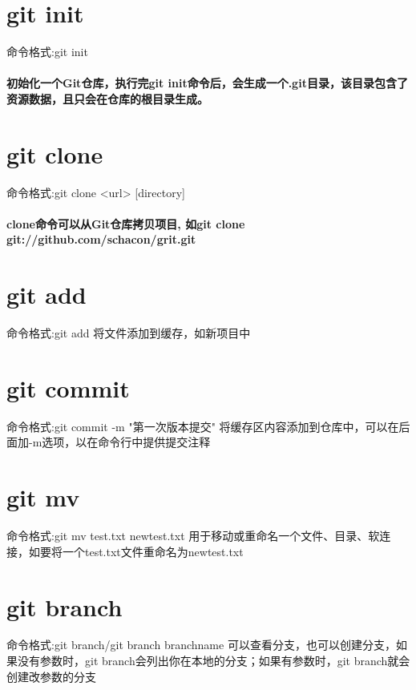 \documentclass[a4paper, 12pt]{article}
\begin{document}
	\title{\color{yellow}{\huge 实验报告}}
	\author{\color{blue}{\large 周雍凡}}
	\date{\today}
	\maketitle
	
	\tableofcontents
	\newpage
	
	
	\section{git init}
	
	{\color{blue} 命令格式:git init}
	\paragraph{初始化一个Git仓库，执行完git init命令后，会生成一个.git目录，该目录包含了资源数据，且只会在仓库的根目录生成。}
	\section{git clone}

	{\color{blue} 命令格式:git clone <url> [directory]}
	\paragraph{clone命令可以从Git仓库拷贝项目,
	如git clone git://github.com/schacon/grit.git}
	
	\section{git add}
	{\color{blue} 命令格式:git add}
	将文件添加到缓存，如新项目中
	
	\section{git commit}
	{\color{blue} 命令格式:git commit -m "第一次版本提交"}
	将缓存区内容添加到仓库中，可以在后面加-m选项，以在命令行中提供提交注释


	\section{git mv}
	{\color{blue} 命令格式:git mv test.txt newtest.txt}
	用于移动或重命名一个文件、目录、软连接，如要将一个test.txt文件重命名为newtest.txt
	
	\section{git branch}
	{\color{blue} 命令格式:git branch/git branch branchname}
	可以查看分支，也可以创建分支，如果没有参数时，git branch会列出你在本地的分支；如果有参数时，git branch就会创建改参数的分支
	
\end{document}
